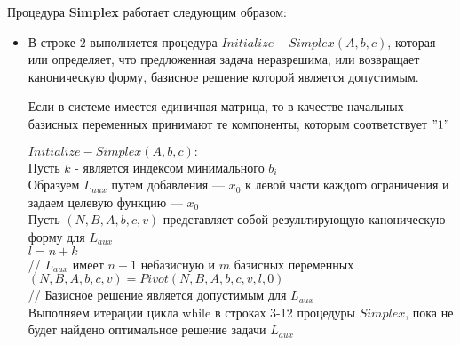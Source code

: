 \documentclass[../body.tex]{subfiles}
\begin{document}
Процедура \textbf{Simplex} работает следующим образом:
\begin{itemize}
	\item В строке $2$ выполняется процедура $Initialize-Simplex(A,b,c)$, которая или определяет, что предложенная задача неразрешима, или возвращает каноническую форму, базисное решение которой является допустимым.
	
	 Если в системе имеется единичная матрица, то в качестве начальных базисных переменных принимают те компоненты, которым соответствует $"1"$\\
	 
	 	\begin{algorithm}[H]
	 	\textbf{$Initialize-Sim plex(A,b,c):$}\\
	 	Пусть $k$ - является индексом минимального $b_i$\\
	 	Образуем $  L_{aux}$ путем добавления — $x_{0}$ к левой части каждого
	 	ограничения и задаем целевую функцию — $x_{0}$\\
	 	Пусть $(N,B,A,b,c,v)$ представляет собой результирующую
	 	каноническую форму для $L_{aux}$
\\
	 	$l = n + k$\\
	 	// $L_{aux}$ имеет $n+1$ небазисную и $ m $ базисных переменных\\
	 	$(N ,B ,A ,b ,c ,v ) = Pivot(N,B, A ,b ,c ,v ,l,0 )$\\
	 	// Базисное решение является допустимым для $L_{aux}$ \\
	 	Выполняем итерации цикла while в строках 3-12 процедуры
	 	$Simplex$, пока не будет найдено оптимальное решение
	 	задачи $L_{aux}$
\\
\end{algorithm}
\end{itemize}
\end{document}
